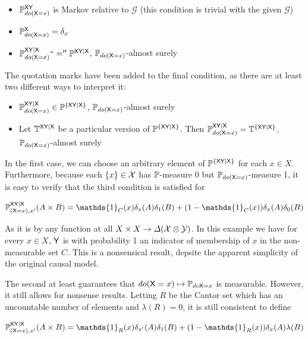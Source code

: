 \begin{itemize}
	\item $\mathbb{P}^{\mathsf{XY}}_{do(\mathsf{X}=x)}$ is Markov relative to $\mathcal{G}$ (this condition is trivial with the given $\mathcal{G}$)
	\item $\mathbb{P}_{do(\mathsf{X}=x)}^{\mathsf{X}}=\delta_x$
	\item $\mathbb{P}_{do(\mathsf{X}=x)}^{\mathsf{XY}|\mathsf{X}}``=''\mathbb{P}^{\mathsf{XY}|\mathsf{X}}$, $\mathbb{P}_{do(\mathsf{X}=x)}$-almost surely
\end{itemize}

The quotation marks have been added to the final condition, as there are at least two different ways to interpret it:

\begin{itemize}
	\item $\mathbb{P}_{do(\mathsf{X}=x)}^{\mathsf{XY}|\mathsf{X}}\in \mathbb{P}^{\{\mathsf{XY}|\mathsf{X}\}}$, $\mathbb{P}_{do(\mathsf{X}=x)}$-almost surely
	\item Let $\mathbb{T}^{\mathsf{XY}|\mathsf{X}}$ be a particular version of $\mathbb{P}^{\{\mathsf{XY}|\mathsf{X}\}}$. Then $\mathbb{P}_{do(\mathsf{X}=x)}^{\mathsf{XY}|\mathsf{X}}= \mathbb{T}^{\{\mathsf{XY}|\mathsf{X}\}}$, $\mathbb{P}_{do(\mathsf{X}=x)}$-almost surely
\end{itemize}

In the first case, we can choose an arbitrary element of $\mathbb{P}^{\{\mathsf{XY}|\mathsf{X}\}}$ for each $x\in X$. Furthermore, because each $\{x\}\in \mathcal{X}$ has $\mathbb{P}$-measure 0 but $\mathbb{P}_{do(\mathsf{X}=x)}$-measure 1, it is easy to verify that the third condition is satisfied for

\begin{align}
	\prob{P}_{\do(\RV{X}=x),x'}^{\RV{XY}|\RV{X}}(A\times B) = \mathds{1}_C(x) \delta_x(A) \delta_1(B) + (1-\mathds{1}_C(x))\delta_x(A)\delta_0(B)
\end{align}

As it is by any function at all $X\times X\to \Delta(\mathcal{X}\otimes\mathcal{Y})$. In this example we have for every $x\in X$, $\mathsf{Y}$ is with probability 1 an indicator of membership of $x$ in the non-measurable set $C$. This is a nonsensical result, depsite the apparent simplicity of the original causal model.

The second at least guarantees that $do(\mathsf{X}=x)\mapsto \mathbb{P}_{do{\mathsf{X}=x}}$ is measurable. However, it still allows for nonsense results. Letting $R$ be the Cantor set which has an uncountable number of elements and $\lambda(R)=0$, it is still consistent to define

\begin{align}
	\prob{P}_{\do(\RV{X}=x),x'}^{\RV{XY}|\RV{X}}(A\times B) = \mathds{1}_R(x)\delta_{x'}(A)\delta_1(B) + (1-\mathds{1}_R(x))\delta_x(A) \lambda(B) \label{eq:cbn_cont2}
\end{align}

